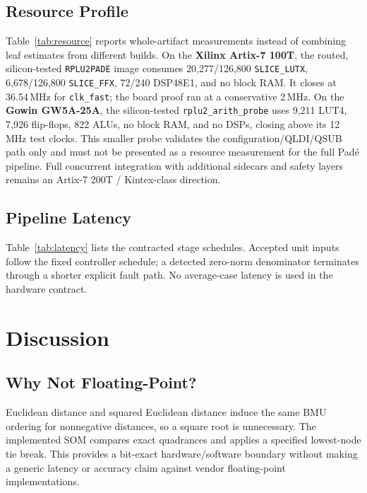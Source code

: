 \documentclass[conference]{IEEEtran}
\begin{document}
\subsection{Resource Profile}

Table~\ref{tab:resource} reports whole-artifact measurements instead of
combining leaf estimates from different builds. On the \textbf{Xilinx
Artix-7 100T}, the routed, silicon-tested \texttt{RPLU2PADE} image consumes
20,277/126,800 \texttt{SLICE\_LUTX}, 6,678/126,800 \texttt{SLICE\_FFX},
72/240 DSP48E1, and no block RAM. It closes at 36.54\,MHz for
\texttt{clk\_fast}; the board proof ran at a conservative 2\,MHz. On the
\textbf{Gowin GW5A-25A}, the silicon-tested \texttt{rplu2\_arith\_probe}
uses 9,211 LUT4, 7,926 flip-flops, 822 ALUs, no block RAM, and no DSPs,
closing above its 12\,MHz test clocks. This smaller probe validates the
configuration/QLDI/QSUB path only and must not be presented as a resource
measurement for the full Pad\'{e} pipeline. Full concurrent integration with
additional sidecars and safety layers remains an Artix-7 200T /
Kintex-class direction.

\subsection{Pipeline Latency}

Table~\ref{tab:latency} lists the contracted stage schedules. Accepted unit
inputs follow the fixed controller schedule; a detected zero-norm denominator
terminates through a shorter explicit fault path. No average-case latency is
used in the hardware contract.


\section{Discussion}
\label{sec:discussion}

\subsection{Why Not Floating-Point?}

Euclidean distance and squared Euclidean distance induce the same BMU ordering
for nonnegative distances, so a square root is unnecessary. The implemented
SOM compares exact quadrances and applies a specified lowest-node tie break.
This provides a bit-exact hardware/software boundary without making a generic
latency or accuracy claim against vendor floating-point implementations.
\end{document}
